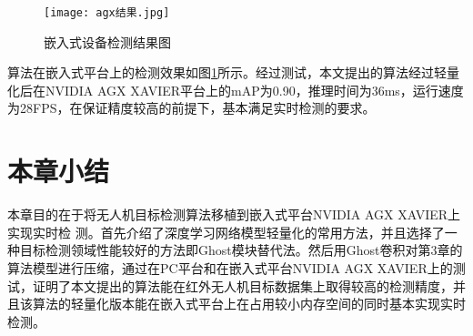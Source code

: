 \begin{figure}[htbp]
    \centering
    \texttt{[image: agx结果.jpg]}
    \caption{嵌入式设备检测结果图}
    \label{agxo}
\end{figure}

算法在嵌入式平台上的检测效果如图\ref{agxo}所示。经过测试，本文提出的算法经过轻量化后在NVIDIA AGX XAVIER平台上的mAP为0.90，推理时间为36ms，运行速度为28FPS，在保证精度较高的前提下，基本满足实时检测的要求。

\section{本章小结}
本章目的在于将无人机目标检测算法移植到嵌入式平台NVIDIA AGX XAVIER上实现实时检
测。首先介绍了深度学习网络模型轻量化的常用方法，并且选择了一种目标检测领域性能较好的方法即Ghost模块替代法。然后用Ghost卷积对第3章的算法模型进行压缩，通过在PC平台和在嵌入式平台NVIDIA AGX XAVIER上的测试，证明了本文提出的算法能在红外无人机目标数据集上取得较高的检测精度，并且该算法的轻量化版本能在嵌入式平台上在占用较小内存空间的同时基本实现实时检测。

